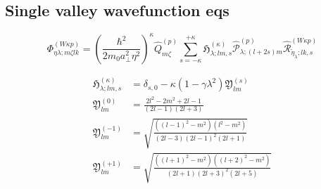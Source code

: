 





% 

\subsection{Single valley wavefunction eqs}
\begin{equation}
    \Phi_{\eta\lambda;m\zeta lk}^{(W\kappa p)}
    = 
    \left(\frac{\hbar^{2}}{2m_{0}a_{\perp}^{2}\eta^{2}}\right)^{\kappa}
    \hat{Q}_{m\zeta}^{(p)}
    \sum_{s=-\kappa}^{+\kappa}
    \mathfrak{H}^{(\kappa)}_{\lambda;lm,s}
    \hat{\mathcal{P}}_{\lambda;(l+2s)m}^{(p)}
    \hat{\mathcal{R}}_{\tilde{\eta}_{\lambda};lk,s}^{(W\kappa p)}
\end{equation}



\begin{align*}
    \mathfrak{H}^{(\kappa)}_{\lambda;lm,s}
    & = 
    \delta_{s,0}-\kappa\left(1-\gamma\lambda^{2}\right)\mathfrak{Y}_{lm}^{(s)}
    \\
    \mathfrak{Y}^{(0)}_{lm}
    & =
    \frac{ 2l^2-2m^2+2l-1 } { (2l-1)(2l+3) }
    \\
    \mathfrak{Y}^{(-1)}_{lm}
    & =
    \sqrt{\frac{
        \left((l-1)^2-m^2\right)\left(l^2-m^2\right)
    }{
        (2l-3)(2l-1)^{2}(2l+1)
    }}
    \\
    \mathfrak{Y}^{(+1)}_{lm}
    & =
    \sqrt{\frac{
        \left((l+1)^2-m^2\right)\left((l+2)^2-m^2\right)
    }{
        (2l+1)(2l+3)^{2}(2l+5)
    }}
\end{align*}


